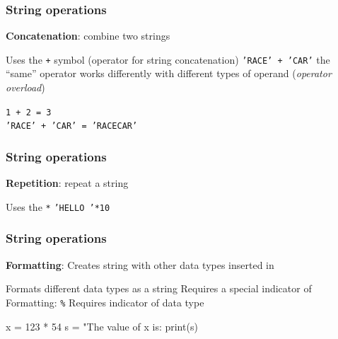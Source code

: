 \documentclass[11pt]{beamer}
\begin{document}
\begin{frame}
  \frametitle{String operations}
  \Enlarge

  \begin{itemize}
  \myitem  \textbf{Concatenation}:  combine two strings
    \begin{itemize}
    \mysubitem  Uses the \texttt{+} symbol (operator for string concatenation) \pause
    \mysubitem  \texttt{'RACE' + 'CAR'}\pause
    \mysubitem the ``same'' operator works differently with different types of operand (\emph{operator overload})
    \end{itemize}
  \end{itemize} \pause
   \vspace{-1mm}
   \hspace{15mm}\texttt{\textcolor{CS101GradBot}{1 + 2 = 3}} \\ \vspace{1mm}
   \hspace{15mm}\texttt{\textcolor{CS101GradBot}{'RACE' + 'CAR' = 'RACECAR'}} 
\end{frame}


\begin{frame}
  \frametitle{String operations}
  \Enlarge

  \begin{itemize}
  \myitem  \textbf{Repetition}:  repeat a string
    \begin{itemize}
    \mysubitem  Uses the \texttt{*}
    \mysubitem  \texttt{'HELLO '*10}
    \end{itemize}
  \end{itemize}
\end{frame}


\begin{frame}[fragile]
  \frametitle{String operations}
  \Enlarge

  \begin{itemize}
  \myitem  \textbf{Formatting}: Creates string with other data types inserted in \pause
    \begin{itemize}
    \mysubitem  Formats different data types as a string \pause
    \mysubitem  Requires a special indicator of Formatting: \texttt{\%}
    \mysubitem  Requires indicator of data type
    \end{itemize} \pause
  \begin{semiverbatim}
x = 123 * 54
s = "The value of x is: %
print(s)
  \end{semiverbatim}
  \end{itemize}
\end{frame}
\end{document}
